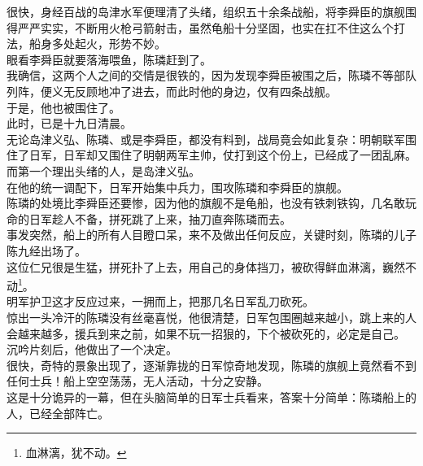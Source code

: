 \begin{multicols}{\theparacolNo}
很快，身经百战的岛津水军便理清了头绪，组织五十余条战船，将李舜臣的旗舰围得严严实实，不断用火枪弓箭射击，虽然龟船十分坚固，也实在扛不住这么个打法，船身多处起火，形势不妙。\\

眼看李舜臣就要落海喂鱼，陈璘赶到了。\\

我确信，这两个人之间的交情是很铁的，因为发现李舜臣被围之后，陈璘不等部队列阵，便义无反顾地冲了进去，而此时他的身边，仅有四条战舰。\\

于是，他也被围住了。\\

此时，已是十九日清晨。\\

无论岛津义弘、陈璘、或是李舜臣，都没有料到，战局竟会如此复杂：明朝联军围住了日军，日军却又围住了明朝两军主帅，仗打到这个份上，已经成了一团乱麻。\\

而第一个理出头绪的人，是岛津义弘。\\

在他的统一调配下，日军开始集中兵力，围攻陈璘和李舜臣的旗舰。\\

陈璘的处境比李舜臣还要惨，因为他的旗舰不是龟船，也没有铁刺铁钩，几名敢玩命的日军趁人不备，拼死跳了上来，抽刀直奔陈璘而去。\\

事发突然，船上的所有人目瞪口呆，来不及做出任何反应，关键时刻，陈璘的儿子陈九经出场了。\\

这位仁兄很是生猛，拼死扑了上去，用自己的身体挡刀，被砍得鲜血淋漓，巍然不动\footnote{血淋漓，犹不动。}。\\

明军护卫这才反应过来，一拥而上，把那几名日军乱刀砍死。\\

惊出一头冷汗的陈璘没有丝毫喜悦，他很清楚，日军包围圈越来越小，跳上来的人会越来越多，援兵到来之前，如果不玩一招狠的，下个被砍死的，必定是自己。\\

沉吟片刻后，他做出了一个决定。\\

很快，奇特的景象出现了，逐渐靠拢的日军惊奇地发现，陈璘的旗舰上竟然看不到任何士兵！船上空空荡荡，无人活动，十分之安静。\\

这是十分诡异的一幕，但在头脑简单的日军士兵看来，答案十分简单：陈璘船上的人，已经全部阵亡。\\


\end{multicols}
